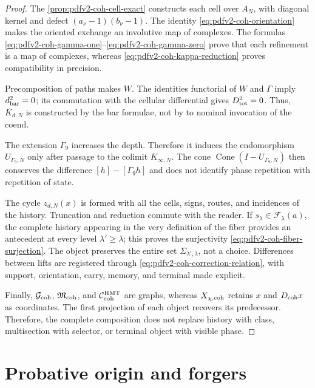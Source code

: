 \begin{proof}
The \cref{prop:pdfv2-coh-cell-exact} constructs each cell over \(A_N\), with
diagonal kernel and defect \((a_\nu-1)(b_\nu-1)\). The identity
\eqref{eq:pdfv2-coh-orientation} makes the oriented exchange an involutive map of
complexes. The formulas
\eqref{eq:pdfv2-coh-gamma-one}--\eqref{eq:pdfv2-coh-gamma-zero} prove that
each refinement is a map of complexes, whereas
\eqref{eq:pdfv2-coh-kappa-reduction} proves compatibility in precision.

Precomposition of paths makes \(W\). The identities
functorial of \(W\) and \(\Gamma\) imply
\(d_{\rm bar}^2=0\); its commutation with the cellular differential gives
\(D_{\rm tot}^2=0\). Thus, \(K_{d,N}\) is constructed by the bar formulae,
not by to nominal invocation of the coend.

The extension \(\Gamma_9\) increases the depth. Therefore it induces the
endomorphism \(U_{\Gamma_9,N}\) only after passage to the colimit
\(K_{\infty,N}\). The cone
\(\operatorname{Cone}(I-U_{\Gamma_9,N})\) then conserves the difference
\([h]-[\Gamma_9h]\) and does not identify phase repetition with repetition
of state.

The cycle \(z_{d,N}(x)\) is formed with all the cells, signs, routes, and incidences of the history. Truncation and reduction commute with the reader. If \(s_\lambda\in\mathscr F_\lambda(a)\), the complete history appearing in the very definition of the fiber provides an antecedent at every level \(\lambda'\geq\lambda\); this proves the surjectivity \eqref{eq:pdfv2-coh-fiber-surjection}. The object preserves the entire set \(\Sigma_{\lambda',\lambda}\), not a choice. Differences between lifts are registered through \eqref{eq:pdfv2-coh-correction-relation}, with support, orientation, carry, memory, and terminal made explicit.

Finally, \(\mathcal G_{\rm coh}\), \(\mathfrak M_{\rm coh}\), and
\(\mathcal C_{\rm coh}^{\rm HMT}\) are graphs, whereas
\(X_{\chi,{\rm coh}}\) retains \(x\) and \(D_{\rm coh}x\) as coordinates.
The first projection of each object recovers its predecessor. Therefore, the
complete composition does not replace history with class, multisection with
selector, or terminal object with visible phase.
\end{proof}

\section{Probative origin and forgers}
\label{sec:pdfv2-coh-provenance-falsifiers}


